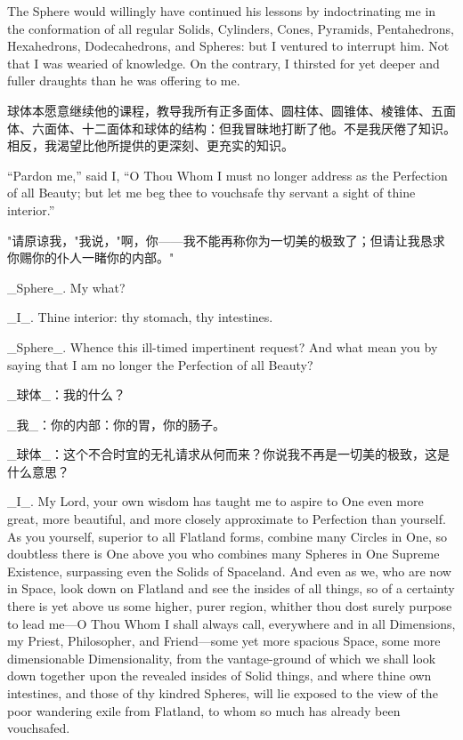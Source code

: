 \documentclass[12pt,UTF8]{ctexbook}
\begin{document}
The Sphere would willingly have continued his lessons by indoctrinating me in the conformation of all regular Solids, Cylinders, Cones, Pyramids, Pentahedrons, Hexahedrons, Dodecahedrons, and Spheres: but I ventured to interrupt him. Not that I was wearied of knowledge. On the contrary, I thirsted for yet deeper and fuller draughts than he was offering to me.

球体本愿意继续他的课程，教导我所有正多面体、圆柱体、圆锥体、棱锥体、五面体、六面体、十二面体和球体的结构：但我冒昧地打断了他。不是我厌倦了知识。相反，我渴望比他所提供的更深刻、更充实的知识。

``Pardon me,'' said I, ``O Thou Whom I must no longer address as the Perfection of all Beauty; but let me beg thee to vouchsafe thy servant a sight of thine interior.''

"请原谅我，"我说，"啊，你——我不能再称你为一切美的极致了；但请让我恳求你赐你的仆人一睹你的内部。"

\_Sphere\_. My what?

\_I\_. Thine interior: thy stomach, thy intestines.

\_Sphere\_. Whence this ill-timed impertinent request? And what mean you by saying that I am no longer the Perfection of all Beauty?

\_球体\_：我的什么？

\_我\_：你的内部：你的胃，你的肠子。

\_球体\_：这个不合时宜的无礼请求从何而来？你说我不再是一切美的极致，这是什么意思？

\_I\_. My Lord, your own wisdom has taught me to aspire to One even more great, more beautiful, and more closely approximate to Perfection than yourself. As you yourself, superior to all Flatland forms, combine many Circles in One, so doubtless there is One above you who combines many Spheres in One Supreme Existence, surpassing even the Solids of Spaceland. And even as we, who are now in Space, look down on Flatland and see the insides of all things, so of a certainty there is yet above us some higher, purer region, whither thou dost surely purpose to lead me---O Thou Whom I shall always call, everywhere and in all Dimensions, my Priest, Philosopher, and Friend---some yet more spacious Space, some more dimensionable Dimensionality, from the vantage-ground of which we shall look down together upon the revealed insides of Solid things, and where thine own intestines, and those of thy kindred Spheres, will lie exposed to the view of the poor wandering exile from Flatland, to whom so much has already been vouchsafed.
\end{document}
